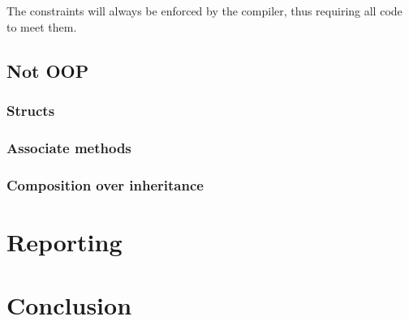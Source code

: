 \documentclass[a4paper,10pt]{article}
\begin{document}
The constraints will always be enforced by the compiler, thus requiring all code to meet them.



\subsection{Not OOP}
\subsubsection{Structs}
\subsubsection{Associate methods}
\subsubsection{Composition over inheritance}





\section{Reporting}

\section{Conclusion}




\end{document}
